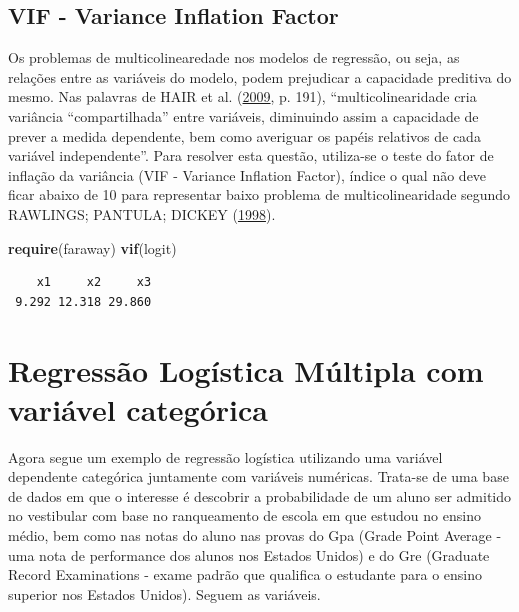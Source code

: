 \documentclass[12pt,brazil,oneside]{book}
\newenvironment{Shaded}{\begin{snugshade}}{\end{snugshade}}
\newcommand{\KeywordTok}[1]{\textcolor[rgb]{0.13,0.29,0.53}{\textbf{#1}}}
\newcommand{\NormalTok}[1]{#1}
\begin{document}
\hypertarget{vif---variance-inflation-factor}{%
\subsection{VIF - Variance Inflation
Factor}\label{vif---variance-inflation-factor}}

Os problemas de multicolinearedade nos modelos de regressão, ou seja, as
relações entre as variáveis do modelo, podem prejudicar a capacidade
preditiva do mesmo. Nas palavras de HAIR et al.
(\protect\hyperlink{ref-Hair2009}{2009}, p. 191), ``multicolinearidade
cria variância ``compartilhada'' entre variáveis, diminuindo assim a
capacidade de prever a medida dependente, bem como averiguar os papéis
relativos de cada variável independente''. Para resolver esta questão,
utiliza-se o teste do fator de inflação da variância (VIF - Variance
Inflation Factor), índice o qual não deve ficar abaixo de 10 para
representar baixo problema de multicolinearidade segundo RAWLINGS;
PANTULA; DICKEY (\protect\hyperlink{ref-Rawlings1998}{1998}).

\begin{Shaded}
\begin{Highlighting}[]
\KeywordTok{require}\NormalTok{(faraway)}
\KeywordTok{vif}\NormalTok{(logit)}
\end{Highlighting}
\end{Shaded}

\begin{verbatim}
    x1     x2     x3 
 9.292 12.318 29.860 
\end{verbatim}

\hypertarget{regressao-logistica-multipla-com-variavel-categorica}{%
\section{Regressão Logística Múltipla com variável
categórica}\label{regressao-logistica-multipla-com-variavel-categorica}}

Agora segue um exemplo de regressão logística utilizando uma variável
dependente categórica juntamente com variáveis numéricas. Trata-se de
uma base de dados em que o interesse é descobrir a probabilidade de um
aluno ser admitido no vestibular com base no ranqueamento de escola em
que estudou no ensino médio, bem como nas notas do aluno nas provas do
Gpa (Grade Point Average - uma nota de performance dos alunos nos
Estados Unidos) e do Gre (Graduate Record Examinations - exame padrão
que qualifica o estudante para o ensino superior nos Estados Unidos).
Seguem as variáveis.
\end{document}
